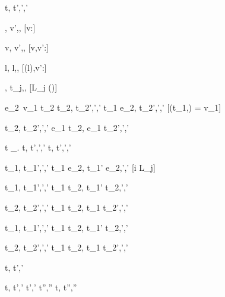 

  {t,\sigma {} t',\sigma',\delta'}



  { }
  {\Enter \tau,\sigma {} \Update v',\sigma,\nothing}
  [v:\beta]

  { }
  {\Update v,\sigma {} \Update v',\sigma,\nothing}
  [v,v':\beta]

  { }
  {\Change l,\sigma {} \Change l,\sigma[l \mapsto v'],}
  [\sigma(l),v':\beta]



	{ }
	{\Pick{},\sigma {} t_j,\sigma,\nothing}
  [L_j \in \Picks(\Pick{})]



	{e_2\ v_1 \eval t_2 \Quad
   t_2,\sigma {} t_2',\sigma',\delta'}
  {t_1 \Step e_2,\sigma {} t_2',\sigma',\delta'}
  [\Value(t_1,\sigma) = v_1]



	{t_2,\sigma {} t_2',\sigma',\delta'}
	{e_1 \Trans t_2,\sigma {} e_1 \Trans t_2',\sigma',\delta'}

  {t \Step \lambda\_. \Forever t,\sigma {} t',\sigma',\delta'}
  {\Forever t,\sigma {} t',\sigma',\delta'}

  {t_1,\sigma {} t_1',\sigma',\delta'}
  {t_1 \Step e_2,\sigma {} t_1' \Step e_2,\sigma',\delta'}
  [i \neq \IContinue L_j]

  {t_1,\sigma {} t_1',\sigma',\delta'}
  {t_1 \Pair t_2,\sigma {} t_1' \Pair t_2,\sigma',\delta'}

  {t_2,\sigma {} t_2',\sigma',\delta'}
  {t_1 \Pair t_2,\sigma {} t_1 \Pair t_2',\sigma',\delta'}

  {t_1,\sigma {} t_1',\sigma',\delta'}
  {t_1 \Choose t_2,\sigma {} t_1' \Choose t_2,\sigma',\delta'}

  {t_2,\sigma {} t_2',\sigma',\delta'}
  {t_1 \Choose t_2,\sigma {} t_1 \Choose t_2',\sigma',\delta'}



  {t,\sigma {} t',\sigma'}



  {t,\sigma {} t',\sigma' \Quad
   t',\sigma' \normalise t'',\sigma''}
  {t,\sigma {} t'',\sigma''}

